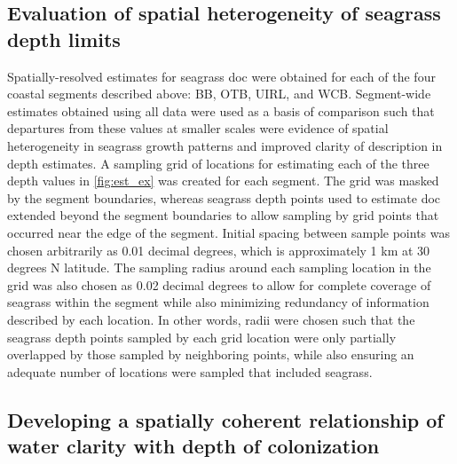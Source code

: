 \documentclass[letterpaper,12pt,oneside]{article}\usepackage[]{graphicx}\usepackage[]{color}
\begin{document}
\subsection{Evaluation of spatial heterogeneity of seagrass depth limits}

Spatially-resolved estimates for seagrass \ac{doc} were obtained for each of the four coastal segments described above: \ac{BB}, \ac{OTB}, \ac{UIRL}, and \ac{WCB}.  Segment-wide estimates obtained using all data were used as a basis of comparison such that departures from these values at smaller scales were evidence of spatial heterogeneity in seagrass growth patterns and improved clarity of description in depth estimates.  A sampling grid of locations for estimating each of the three depth values in \cref{fig:est_ex} was created for each segment.  The grid was masked by the segment boundaries, whereas seagrass depth points used to estimate \ac{doc} extended beyond the segment boundaries to allow sampling by grid points that occurred near the edge of the segment.  Initial spacing between sample points was chosen arbitrarily as 0.01 decimal degrees, which is approximately 1 km at 30 degrees N latitude.  The sampling radius around each sampling location in the grid was also chosen as 0.02 decimal degrees to allow for complete coverage of seagrass within the segment while also minimizing redundancy of information described by each location.  In other words, radii were chosen such that the seagrass depth points sampled by each grid location were only partially overlapped by those sampled by neighboring points, while also ensuring an adequate number of locations were sampled that included seagrass.

\subsection{Developing a spatially coherent relationship of water clarity with depth of colonization}
\end{document}
